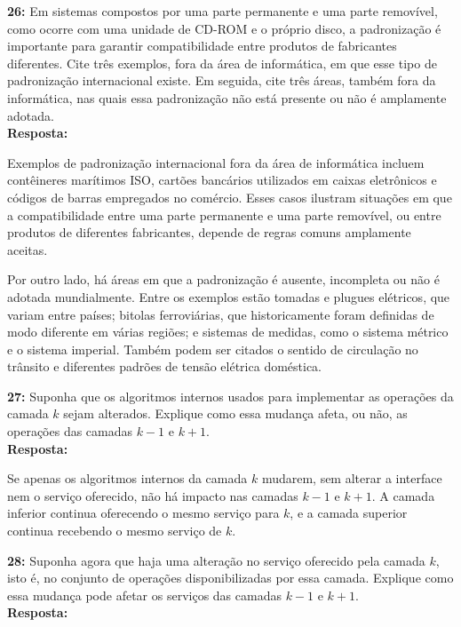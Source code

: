 \documentclass[12pt,a4paper]{report}
\begin{document}
\vspace{0.6cm}

\noindent \textbf{26:} Em sistemas compostos por uma parte permanente e uma parte removível, como ocorre com uma unidade de CD-ROM e o próprio disco, a padronização é importante para garantir compatibilidade entre produtos de fabricantes diferentes. Cite três exemplos, fora da área de informática, em que esse tipo de padronização internacional existe. Em seguida, cite três áreas, também fora da informática, nas quais essa padronização não está presente ou não é amplamente adotada. \\
\textbf{Resposta:}

Exemplos de padronização internacional fora da área de informática incluem contêineres marítimos ISO, cartões bancários utilizados em caixas eletrônicos e códigos de barras empregados no comércio. Esses casos ilustram situações em que a compatibilidade entre uma parte permanente e uma parte removível, ou entre produtos de diferentes fabricantes, depende de regras comuns amplamente aceitas.

Por outro lado, há áreas em que a padronização é ausente, incompleta ou não é adotada mundialmente. Entre os exemplos estão tomadas e plugues elétricos, que variam entre países; bitolas ferroviárias, que historicamente foram definidas de modo diferente em várias regiões; e sistemas de medidas, como o sistema métrico e o sistema imperial. Também podem ser citados o sentido de circulação no trânsito e diferentes padrões de tensão elétrica doméstica.

\vspace{0.6cm}

\noindent \textbf{27:} Suponha que os algoritmos internos usados para implementar as operações da camada \(k\) sejam alterados. Explique como essa mudança afeta, ou não, as operações das camadas \(k - 1\) e \(k + 1\). \\
\textbf{Resposta:}

Se apenas os algoritmos internos da camada \(k\) mudarem, sem alterar a interface nem o serviço oferecido, não há impacto nas camadas \(k-1\) e \(k+1\). A camada inferior continua oferecendo o mesmo serviço para \(k\), e a camada superior continua recebendo o mesmo serviço de \(k\).

\vspace{0.6cm}

\noindent \textbf{28:} Suponha agora que haja uma alteração no serviço oferecido pela camada \(k\), isto é, no conjunto de operações disponibilizadas por essa camada. Explique como essa mudança pode afetar os serviços das camadas \(k - 1\) e \(k + 1\). \\
\textbf{Resposta:}
\end{document}
